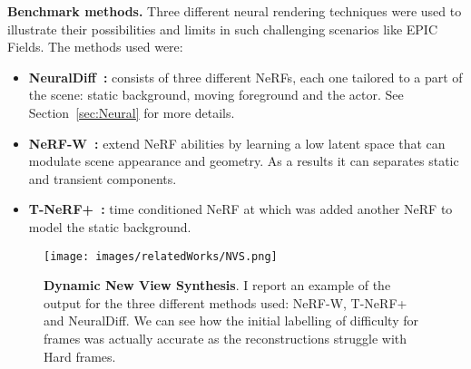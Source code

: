 \textbf{Benchmark methods.} Three different neural rendering techniques were used to illustrate their possibilities and limits in such challenging scenarios like
EPIC Fields. The methods used were:
\begin{itemize}
    \item \textbf{NeuralDiff~\cite{neuraldiff}:} consists of three different NeRFs, each one tailored to a part of the scene: static background, moving foreground and the actor. See 
        Section~\ref{sec:Neural} for more details.
    \item \textbf{NeRF-W~\cite{nerfw}:} extend NeRF abilities by learning a low latent space that can modulate scene appearance and geometry. As a results it can separates static and transient
            components.
    \item \textbf{T-NeRF+~\cite{Tnerf}:} time conditioned NeRF at which was added another NeRF to model the static background.
\end{itemize}



\begin{figure}[t]
    \centering
    \texttt{[image: images/relatedWorks/NVS.png]} 
    \caption{\textbf{Dynamic New View Synthesis}. I report an example of the output for the three different methods used: NeRF-W, T-NeRF+ and 
    NeuralDiff. We can see how the initial labelling of difficulty for frames was actually accurate as the reconstructions
    struggle with Hard frames.}\label{fig:NVS}
\end{figure}


